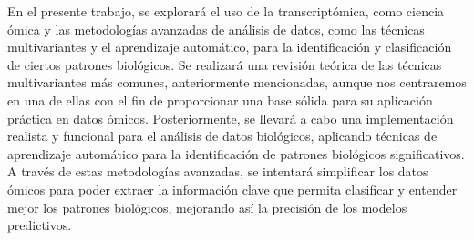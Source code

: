 En el presente trabajo, se explorará el uso de la transcriptómica, como ciencia ómica y las metodologías avanzadas de análisis de 
datos, como las técnicas multivariantes y el aprendizaje automático, para la identificación y clasificación 
de ciertos patrones biológicos. Se realizará una revisión teórica de las técnicas multivariantes más comunes, 
anteriormente mencionadas, aunque nos centraremos en una de ellas con el fin de proporcionar una base sólida 
para su aplicación práctica en datos ómicos. Posteriormente, se llevará a cabo una implementación realista y 
funcional para el análisis de datos biológicos, aplicando técnicas de aprendizaje automático para la identificación 
de patrones biológicos significativos. A través de estas metodologías avanzadas, se intentará simplificar los datos 
ómicos para poder extraer la información clave que permita clasificar y entender mejor los patrones biológicos, 
mejorando así la precisión de los modelos predictivos.

